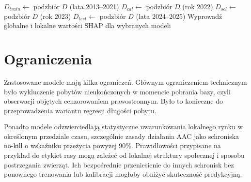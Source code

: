 \begin{algorithm}[htbp]
\caption{Protokół treningu i oceny modelu}\label{alg:protokol}
\BlankLine
$D_{train} \gets$ podzbiór $D$ (lata 2013--2021)\;
$D_{cal} \gets$ podzbiór $D$ (rok 2022)\;
$D_{sel} \gets$ podzbiór $D$ (rok 2023)\;
$D_{test} \gets$ podzbiór $D$ (lata 2024--2025)\;
Wyprowadź globalne i lokalne wartości SHAP dla wybranych modeli\;
\end{algorithm}

\section{Ograniczenia}
\label{sec:ograniczenia-modelowania}

Zastosowane modele mają kilka ograniczeń. Głównym ograniczeniem technicznym było wykluczenie pobytów nieukończonych w momencie pobrania bazy, czyli obserwacji objętych cenzorowaniem prawostronnym. Było to konieczne do przeprowadzenia wariantu regresji długości pobytu.

Ponadto modele odzwierciedlają statystyczne uwarunkowania lokalnego rynku w określonym przedziale czasu, szczególnie zasady działania AAC jako schroniska no-kill o wskaźniku przeżycia powyżej 90\%. Prawidłowości przypisane na przykład do etykiet rasy mogą zależeć od lokalnej struktury społecznej i sposobu postrzegania zwierząt. Ich bezpośrednie przeniesienie do innych schronisk bez ponownego trenowania lub kalibracji mogłoby obniżyć skuteczność predykcyjną.
